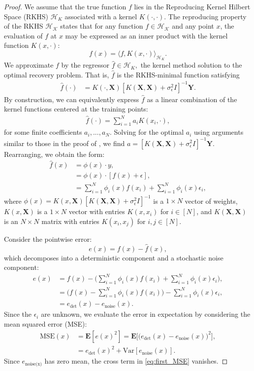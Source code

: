 \documentclass{article}
\theoremstyle{definition}
\theoremstyle{remark}
\begin{document}
\begin{proof}
We assume that the true function $f$ lies in the Reproducing Kernel Hilbert Space (RKHS) $\mathcal{H}_K$ associated with a kernel $K(\cdot,\cdot)$. The reproducing property of the RKHS $\mathcal{H}_{\mathcal{K}}$ states that for any function $f\in\mathcal{H_K}$ and any point $x$, the evaluation of $f$ at $x$ may be expressed as an inner product with the kernel function $K(x,\cdot)$:
$$f(x)=	\langle f,K(x,\cdot)\rangle_{\mathcal{H}_{K}}.$$ We approximate $f$ by the regressor $\hat{f}\in\mathcal{H}_K,$ the kernel method solution to the optimal recovery problem. That is, $\hat{f}$ is the RKHS-minimal function satisfying 
\begin{align}
    \hat{f}(\cdot)&=K(\cdot,\mathbf{X})[K(\mathbf{X},\mathbf{X})+\sigma_{\epsilon}^2 I]^{-1}\mathbf{Y}.
\end{align}
By construction, we can equivalently express $\hat{f}$ as a linear combination of the kernel functions centered at the training points:
\begin{align}
    \hat{f}(\cdot)=\sum_{i=1}^N a_i K(x_i,\cdot),
\end{align}
for some finite coefficients $a_i,...,a_N.$ Solving for the optimal $a_i$ using arguments similar to those in the proof of , we find $a=[K(\mathbf{X},\mathbf{X})+\sigma_{\epsilon}^2I]^{-1}\mathbf{Y}$. Rearranging, we obtain the form:
\begin{align}\label{eq:interpolant_innerproduct}
    \hat{f}(x)&=\phi(x)\cdot y,\nonumber\\
    &=\phi(x)\cdot[f(x)+\epsilon],\nonumber\\
    &=\sum_{i=1}^N \phi_i(x)f(x_i)+\sum_{i=1}^N \phi_i(x)\epsilon_i,
\end{align}
where $\phi(x)=K(x,\mathbf{X})[K(\mathbf{X},\mathbf{X})+\sigma_{\epsilon}^2I]^{-1}$ is a $1\times N$ vector of weights, $K(x,\mathbf{X})$ is a $1\times N$ vector with entries $K(x,x_i)$ for $i\in[N]$, and $K(\mathbf{X},\mathbf{X})$ is an $N\times N$ matrix with entries $K(x_i,x_j)$ for $i,j\in[N]$. 

Consider the pointwise error: $$e(x)=f(x)-\hat{f}(x),$$ which decomposes into a deterministic component and a stochastic noise component:
\begin{align}
    e(x)&=f(x)-\Bigg(\sum_{i=1}^N \phi_i(x)f(x_i)+\sum_{i=1}^N \phi_i(x)\epsilon_i\Bigg),\\
    &=\Bigg(f(x)-\sum_{i=1}^N \phi_i(x)f(x_i)\Bigg) - \sum_{i=1}^N \phi_i(x)\epsilon_i,\\
    &=e_{\text{det}}(x)-e_{\text{noise}}(x).
\end{align}
Since the $\epsilon_i$ are unknown, we evaluate the error in expectation by considering the mean squared error (MSE):
\begin{align}
    \text{MSE}(x)&=\mathbf{E}[e(x)^2]=\mathbf{E}\big[\big(e_\text{det}(x)-e_\text{noise}(x)\big)^2\big],\\
    &=e_\text{det}(x)^2+\text{Var}[e_\text{noise}(x)].\label{eq:first_MSE}
\end{align}
Since $e_\text{noise(x)}$ has zero mean, the cross term in \eqref{eq:first_MSE} vanishes.


\end{proof}
\end{document}
